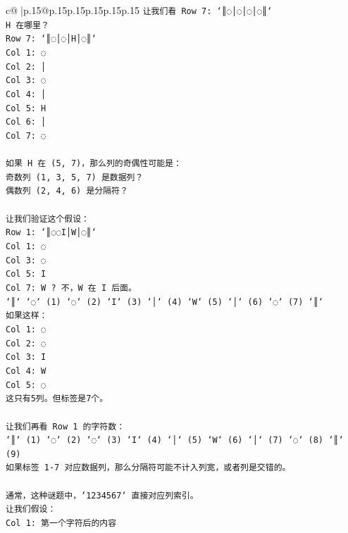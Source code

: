 \documentclass{article}
\begin{document}
{\begin{supertabular}{c@{$\;$}|p{.15\linewidth}@{}p{.15\linewidth}p{.15\linewidth}p{.15\linewidth}p{.15\linewidth}p{.15\linewidth}}
{{{\texttt{让我们看 Row 7: `║◌│◌│◌│◌║`} \\
\texttt{H 在哪里？} \\
\texttt{Row 7: `║◌│◌│H│◌║`} \\
\texttt{Col 1: ◌} \\
\texttt{Col 2: │} \\
\texttt{Col 3: ◌} \\
\texttt{Col 4: │} \\
\texttt{Col 5: H} \\
\texttt{Col 6: │} \\
\texttt{Col 7: ◌} \\
\\ 
\texttt{如果 H 在 (5, 7)，那么列的奇偶性可能是：} \\
\texttt{奇数列 (1, 3, 5, 7) 是数据列？} \\
\texttt{偶数列 (2, 4, 6) 是分隔符？} \\
\\ 
\texttt{让我们验证这个假设：} \\
\texttt{Row 1: `║◌◌I│W│◌║`} \\
\texttt{Col 1: ◌} \\
\texttt{Col 3: ◌} \\
\texttt{Col 5: I} \\
\texttt{Col 7: W ? 不，W 在 I 后面。} \\
\texttt{`║` `◌` (1) `◌` (2) `I` (3) `│` (4) `W` (5) `│` (6) `◌` (7) `║`} \\
\texttt{如果这样：} \\
\texttt{Col 1: ◌} \\
\texttt{Col 2: ◌} \\
\texttt{Col 3: I} \\
\texttt{Col 4: W} \\
\texttt{Col 5: ◌} \\
\texttt{这只有5列。但标签是7个。} \\
\\ 
\texttt{让我们再看 Row 1 的字符数：} \\
\texttt{`║` (1) `◌` (2) `◌` (3) `I` (4) `│` (5) `W` (6) `│` (7) `◌` (8) `║` (9)} \\
\texttt{如果标签 1{-}7 对应数据列，那么分隔符可能不计入列宽，或者列是交错的。} \\
\\ 
\texttt{通常，这种谜题中，`1234567` 直接对应列索引。} \\
\texttt{让我们假设：} \\
\texttt{Col 1: 第一个字符后的内容} \\
}}}
\end{supertabular}}
\end{document}
